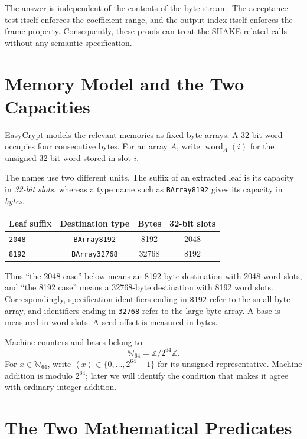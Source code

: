 \documentclass[11pt]{article}
\theoremstyle{definition}
\theoremstyle{plain}
\theoremstyle{remark}
\newcommand{\code}[1]{\nolinkurl{#1}}
\newcommand{\Z}{\mathbb Z}
\newcommand{\Wsixtyfour}{\mathbb W_{64}}
\newcommand{\uint}[1]{\left\langle #1\right\rangle}
\newcommand{\word}[2]{\operatorname{word}_{#1}(#2)}
\begin{document}
The answer is independent of the contents of the byte stream.  The acceptance
test itself enforces the coefficient range, and the output index itself
enforces the frame property.  Consequently, these proofs can treat the
SHAKE-related calls without any semantic specification.

\section{Memory Model and the Two Capacities}

EasyCrypt models the relevant memories as fixed byte arrays.  A 32-bit word
occupies four consecutive bytes.  For an array $A$, write $\word{A}{i}$ for
the unsigned 32-bit word stored in slot $i$.

The names use two different units.  The suffix of an extracted leaf is its
capacity in \emph{32-bit slots}, whereas a type name such as
\code{BArray8192} gives its capacity in \emph{bytes}.

\begin{center}
\begin{tabular}{lccc}
\toprule
Leaf suffix & Destination type & Bytes & 32-bit slots \\
\midrule
\code{2048} & \code{BArray8192} & 8192 & 2048 \\
\code{8192} & \code{BArray32768} & 32768 & 8192 \\
\bottomrule
\end{tabular}
\end{center}

Thus ``the 2048 case'' below means an 8192-byte destination with 2048 word
slots, and ``the 8192 case'' means a 32768-byte destination with 8192 word
slots.  Correspondingly, specification identifiers ending in \code{8192}
refer to the small byte array, and identifiers ending in \code{32768} refer
to the large byte array.  A base is measured in word slots.  A seed offset is
measured in bytes.

Machine counters and bases belong to
\[
  \Wsixtyfour=\Z/2^{64}\Z.
\]
For $x\in\Wsixtyfour$, write $\uint{x}\in\{0,\ldots,2^{64}-1\}$ for
its unsigned representative.  Machine addition is modulo $2^{64}$; later we
will identify the condition that makes it agree with ordinary integer
addition.

\section{The Two Mathematical Predicates}
\end{document}
